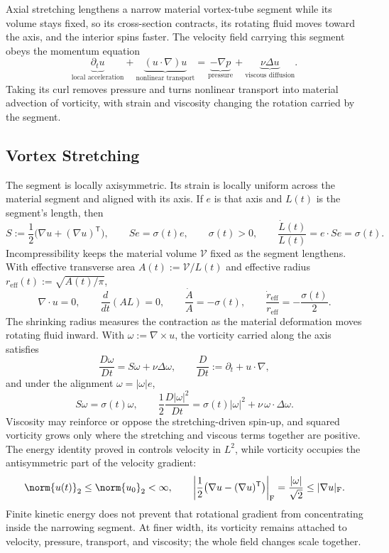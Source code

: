 
Axial stretching lengthens a narrow material vortex-tube segment while its volume stays fixed, so its cross-section contracts, its rotating fluid moves toward the axis, and the interior spins faster.
The velocity field carrying this segment obeys the momentum equation
\[
  \underbrace{\partial_t u}_{\text{local acceleration}}
  +
  \underbrace{(u\cdot\nabla)u}_{\text{nonlinear transport}}
  =
  \underbrace{-\nabla p}_{\text{pressure}}
  +
  \underbrace{\nu\Delta u}_{\text{viscous diffusion}}.
\]
Taking its curl removes pressure and turns nonlinear transport into material advection of vorticity, with strain and viscosity changing the rotation carried by the segment.

\subsection{Vortex Stretching}\label{sub:ThePerfectlyStretchingVortex}

The segment is locally axisymmetric.
Its strain is locally uniform across the material segment and aligned with its axis.
If \(e\) is that axis and \(L(t)\) is the segment's length, then
\[
  S:=\frac12\bigl(\nabla u+(\nabla u)^{\mathsf T}\bigr),
  \qquad
  Se=\sigma(t)e,
  \qquad
  \sigma(t)>0,
  \qquad
  \frac{\dot L(t)}{L(t)}
  =
  e\cdot Se
  =
  \sigma(t).
\]
Incompressibility keeps the material volume \(\mathcal V\) fixed as the segment lengthens.
With effective transverse area \(A(t):=\mathcal V/L(t)\) and effective radius \(r_{\mathrm{eff}}(t):=\sqrt{A(t)/\pi}\),
\[
  \nabla\cdot u=0,
  \qquad
  \frac{d}{dt}(A L)=0,
  \qquad
  \frac{\dot A}{A}=-\sigma(t),
  \qquad
  \frac{\dot r_{\mathrm{eff}}}{r_{\mathrm{eff}}}
  =
  -\frac{\sigma(t)}{2}.
\]
The shrinking radius measures the contraction as the material deformation moves rotating fluid inward.
With \(\omega:=\nabla\times u\), the vorticity carried along the axis satisfies
\[
  \frac{D\omega}{Dt}
  =
  S\omega+\nu\Delta\omega,
  \qquad
  \frac{D}{Dt}
  :=
  \partial_t+u\cdot\nabla,
\]
and under the alignment \(\omega=|\omega|e\),
\[
  S\omega
  =
  \sigma(t)\omega,
  \qquad
  \frac12\frac{D|\omega|^2}{Dt}
  =
  \sigma(t)|\omega|^2
  +
  \nu\,\omega\cdot\Delta\omega.
\]
Viscosity may reinforce or oppose the stretching-driven spin-up, and squared vorticity grows only where the stretching and viscous terms together are positive.
The energy identity proved in  controls velocity in \(L^2\), while vorticity occupies the antisymmetric part of the velocity gradient:
\[
  \norm{u(t)}_2
  \leq
  \norm{u_0}_2
  <\infty,
  \qquad
  \left|\frac12\bigl(\nabla u-(\nabla u)^{\mathsf T}\bigr)\right|_{\mathrm F}
  =
  \frac{|\omega|}{\sqrt2}
  \leq
  |\nabla u|_{\mathrm F}.
\]
Finite kinetic energy does not prevent that rotational gradient from concentrating inside the narrowing segment.
At finer width, its vorticity remains attached to velocity, pressure, transport, and viscosity; the whole field changes scale together.


